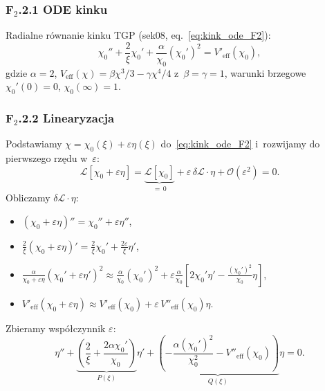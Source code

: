 \subsubsection*{F$_2$.2.1 ODE kinku}

Radialne równanie kinku TGP (sek08, eq.~\eqref{eq:kink_ode_F2}):
\begin{equation}
  \chi_0'' + \frac{2}{\xi}\chi_0'
  + \frac{\alpha}{\chi_0}(\chi_0')^2
  = V'_\mathrm{eff}(\chi_0),
  \label{eq:kink_ode_F2}
\end{equation}
gdzie $\alpha = 2$, $V_\mathrm{eff}(\chi) = \beta\chi^3/3 - \gamma\chi^4/4$
z~$\beta = \gamma = 1$, warunki brzegowe $\chi_0'(0) = 0$,
$\chi_0(\infty) = 1$.

\subsubsection*{F$_2$.2.2 Linearyzacja}

Podstawiamy $\chi = \chi_0(\xi) + \varepsilon\eta(\xi)$
do~\eqref{eq:kink_ode_F2} i~rozwijamy do pierwszego rzędu
w~$\varepsilon$:
\begin{equation}
  \mathcal{L}[\chi_0 + \varepsilon\eta]
  = \underbrace{\mathcal{L}[\chi_0]}_{=\,0}
  + \varepsilon\,\delta\mathcal{L}\cdot\eta
  + \mathcal{O}(\varepsilon^2) = 0.
\end{equation}
Obliczamy $\delta\mathcal{L}\cdot\eta$:
\begin{itemize}
  \item $(\chi_0 + \varepsilon\eta)'' = \chi_0'' + \varepsilon\eta''$,
  \item $\frac{2}{\xi}(\chi_0 + \varepsilon\eta)' = \frac{2}{\xi}\chi_0'
    + \frac{2\varepsilon}{\xi}\eta'$,
  \item $\frac{\alpha}{\chi_0+\varepsilon\eta}(\chi_0'+\varepsilon\eta')^2
    \approx \frac{\alpha}{\chi_0}(\chi_0')^2
    + \varepsilon\frac{\alpha}{\chi_0}\!\left[2\chi_0'\eta'
    - \frac{(\chi_0')^2}{\chi_0}\eta\right]$,
  \item $V'_\mathrm{eff}(\chi_0+\varepsilon\eta)
    \approx V'_\mathrm{eff}(\chi_0) + \varepsilon\,V''_\mathrm{eff}(\chi_0)\eta$.
\end{itemize}
Zbieramy współczynnik $\varepsilon$:
\begin{equation}
  \eta'' + \underbrace{\left(\frac{2}{\xi}
  + \frac{2\alpha\chi_0'}{\chi_0}\right)}_{P(\xi)}\eta'
  + \underbrace{\left(-\frac{\alpha(\chi_0')^2}{\chi_0^2}
  - V''_\mathrm{eff}(\chi_0)\right)}_{Q(\xi)}\eta = 0.
  \label{eq:fluct_ode}
\end{equation}

